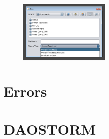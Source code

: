 \documentclass[aspectratio=169]{beamer}
\begin{document}
\begin{frame}
 
 \begin{figure}[h!]
    \centering	\includegraphics[width=0.4\textwidth]{./images/graspj_results2.png} 
    \caption{}
    \label{fig:results2}
    \end{figure} 
 
\end{frame}

\section{Errors}

\section{DAOSTORM}
\end{document}
